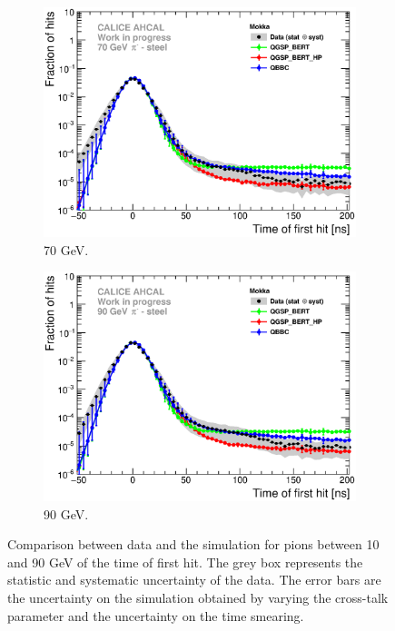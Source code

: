 \begin{figure}[htbp!]
\begin{subfigure}[t]{0.49\textwidth}
    \centering
    \includegraphics[width=1\textwidth]{../Thesis_Plots/Timing/Pions/Plots/ComparisonToSim/Comparison_SimData_Pion70GeV_LateClusters.eps}
    \caption{70 GeV.} \label{fig:dNdt_SimData_70GeV}
  \end{subfigure}
  \hfill
  \begin{subfigure}[t]{0.49\textwidth}
    \centering
    \includegraphics[width=1\textwidth]{../Thesis_Plots/Timing/Pions/Plots/ComparisonToSim/Comparison_SimData_Pion90GeV_LateClusters.eps}
    \caption{90 GeV.} \label{fig:dNdt_SimData_90GeV}
  \end{subfigure}
  \caption{Comparison between data and the \mokka simulation for pions between 10 and 90 GeV of the time of first hit. The grey box represents the statistic and systematic uncertainty of the data. The error bars are the uncertainty on the \mokka simulation obtained by varying the cross-talk parameter and the uncertainty on the time smearing.}
\end{figure}

